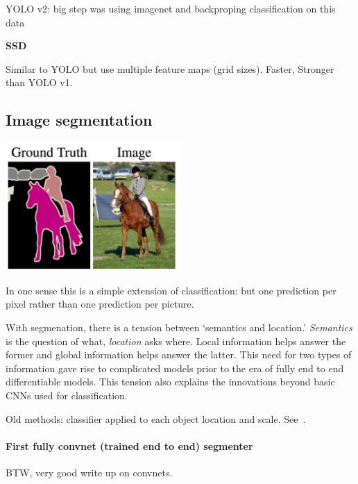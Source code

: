 \documentclass[12pt, a4paper, oneside, headinclude, footinclude]{article}
\begin{document}
YOLO v2: big step was using imagenet and backproping classification on this
data

\textbf{SSD}~\cite{liu2016ssd}

Similar to YOLO but use multiple feature maps (grid sizes). Faster, Stronger
than YOLO v1.

\subsection{Image segmentation}

\includegraphics[width=0.5\textwidth]{Figures/segmentation-example.png}

In one sense this is a simple extension of classification: but one prediction
per pixel rather than one prediction per picture.

With segmenation, there is a tension between `semantics and location.'
\textit{Semantics} is the question of what, \textit{location} asks where.
Local information helps answer the former and global information helps answer
the latter. This need for two types of information gave rise to complicated
models prior to the era of fully end to end differentiable models. This
tension also explains the innovations beyond basic CNNs used for
classification.

Old methods: classifier applied to each object location and scale.
See~\cite{NIPS2015_5852}.

\paragraph{First fully convnet (trained end to end) segmenter}

BTW, very good write up on convnets.~\cite{long2015fully}
\end{document}
